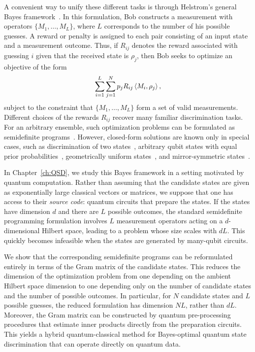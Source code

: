 A convenient way to unify these different tasks is through Helstrom's general Bayes framework~\cite{helstrom2003bayes}. 
In this formulation, Bob constructs a measurement with operators $\{M_1, \ldots, M_L\}$, where $L$ corresponds to the number of his possible guesses. 
A reward or penalty is assigned to each pair consisting of an input state and a measurement outcome. 
Thus, if $R_{ij}$ denotes the reward associated with guessing $i$ given that the received state is $\rho_j$, then Bob seeks to optimize an objective of the form
\begin{equation*}
    \sum_{i=1}^L\sum_{j=1}^N p_j R_{ij} \left\langle M_i, \rho_j \right\rangle,
\end{equation*}
subject to the constraint that $\{M_1, \ldots, M_L\}$ form a set of valid measurements. 
Different choices of the rewards $R_{ij}$ recover many familiar discrimination tasks. 
For an arbitrary ensemble, such optimization problems can be formulated as semidefinite programs~\cite{eldar2003designing, eldar2003semidefinite}. 
However, closed-form solutions are known only in special cases, such as discrimination of two states~\cite{helstrom1969quantum}, arbitrary qubit states with equal prior probabilities~\cite{deconinck2010qubit}, geometrically uniform states~\cite{eldar2004optimal}, and mirror-symmetric states~\cite{andersson2002minimum}.

In Chapter~\ref{ch:QSD}, we study this Bayes framework in a setting motivated by quantum computation. 
Rather than assuming that the candidate states are given as exponentially large classical vectors or matrices, we suppose that one has access to their \emph{source code}: quantum circuits that prepare the states. 
If the states have dimension $d$ and there are $L$ possible outcomes, the standard semidefinite programming formulation involves $L$ measurement operators acting on a $d$-dimensional Hilbert space, leading to a problem whose size scales with $d L$. 
This quickly becomes infeasible when the states are generated by many-qubit circuits.

We show that the corresponding semidefinite programs can be reformulated entirely in terms of the Gram matrix of the candidate states. 
This reduces the dimension of the optimization problem from one depending on the ambient Hilbert space dimension to one depending only on the number of candidate states and the number of possible outcomes. 
In particular, for $N$ candidate states and $L$ possible guesses, the reduced formulation has dimension $N L$, rather than $d L$. 
Moreover, the Gram matrix can be constructed by quantum pre-processing procedures that estimate inner products directly from the preparation circuits. 
This yields a hybrid quantum-classical method for Bayes-optimal quantum state discrimination that can operate directly on quantum data.

